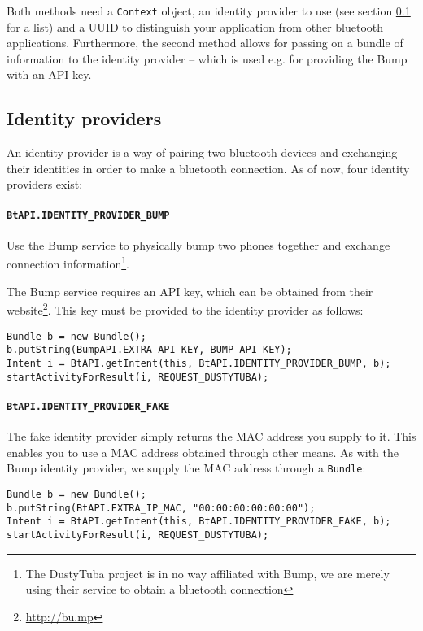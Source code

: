 \documentclass[a4paper,11pt]{article}
\begin{document}
Both methods need a \verb+Context+ object, an identity provider to use (see section \ref{identity-providers} for a list) and a UUID to distinguish your application from other bluetooth applications. Furthermore, the second method allows for passing on a bundle of information to the identity provider -- which is used e.g. for providing the Bump\texttrademark{} with an API key.

\subsection{Identity providers}
\label{identity-providers}
An identity provider is a way of pairing two bluetooth devices and exchanging their identities in order to make a bluetooth connection. As of now, four identity providers exist:

\paragraph{{\tt BtAPI.IDENTITY\_PROVIDER\_BUMP}}
Use the Bump\texttrademark{} service to physically bump two phones together and exchange connection information\footnote{The DustyTuba project is in no way affiliated with Bump\texttrademark, we are merely using their service to obtain a bluetooth connection}.

The Bump\texttrademark{} service requires an API key, which can be obtained from their website\footnote{\url{http://bu.mp}}. This key must be provided to the identity provider as follows:

\footnotesize
\begin{verbatim}
Bundle b = new Bundle();
b.putString(BumpAPI.EXTRA_API_KEY, BUMP_API_KEY);
Intent i = BtAPI.getIntent(this, BtAPI.IDENTITY_PROVIDER_BUMP, b);
startActivityForResult(i, REQUEST_DUSTYTUBA);
\end{verbatim}
\normalsize

\paragraph{{\tt BtAPI.IDENTITY\_PROVIDER\_FAKE}}
The fake identity provider simply returns the MAC address you supply to it. This enables you to use a MAC address obtained through other means. As with the Bump\texttrademark{} identity provider, we supply the MAC address through a \verb+Bundle+:

\footnotesize
\begin{verbatim}
Bundle b = new Bundle();
b.putString(BtAPI.EXTRA_IP_MAC, "00:00:00:00:00:00");
Intent i = BtAPI.getIntent(this, BtAPI.IDENTITY_PROVIDER_FAKE, b);
startActivityForResult(i, REQUEST_DUSTYTUBA);
\end{verbatim}
\normalsize
\end{document}
